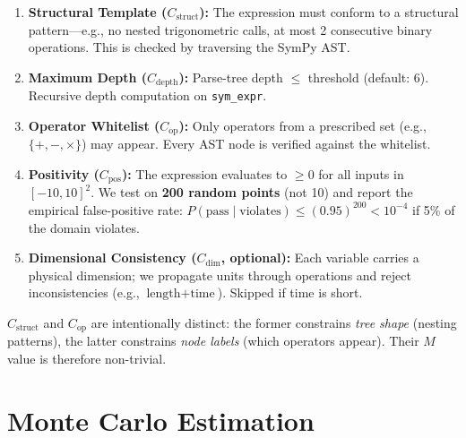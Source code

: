 \documentclass[11pt,a4paper]{article}
\begin{document}
\begin{enumerate}[label=\textbf{C\arabic*}]
  \item \textbf{Structural Template ($C_{\mathrm{struct}}$):} The expression must conform to a structural pattern---e.g., no nested trigonometric calls, at most 2 consecutive binary operations. This is checked by traversing the SymPy AST.

  \item \textbf{Maximum Depth ($C_{\mathrm{depth}}$):} Parse-tree depth $\le$ threshold (default: 6). Recursive depth computation on \texttt{sym\_expr}.

  \item \textbf{Operator Whitelist ($C_{\mathrm{op}}$):} Only operators from a prescribed set (e.g., $\{+, -, \times\}$) may appear. Every AST node is verified against the whitelist.

  \item \textbf{Positivity ($C_{\mathrm{pos}}$):} The expression evaluates to $\ge 0$ for all inputs in $[-10, 10]^2$. We test on \textbf{200 random points} (not 10) and report the empirical false-positive rate: $P(\text{pass} \mid \text{violates}) \le (0.95)^{200} < 10^{-4}$ if 5\% of the domain violates.

  \item \textbf{Dimensional Consistency ($C_{\mathrm{dim}}$, optional):} Each variable carries a physical dimension; we propagate units through operations and reject inconsistencies (e.g., $\text{length} + \text{time}$). Skipped if time is short.
\end{enumerate}

\begin{notebox}
$C_{\mathrm{struct}}$ and $C_{\mathrm{op}}$ are intentionally distinct: the former constrains \textit{tree shape} (nesting patterns), the latter constrains \textit{node labels} (which operators appear). Their $M$ value is therefore non-trivial.
\end{notebox}

\section{Monte Carlo Estimation}
\label{sec:montecarlo}
\end{document}
